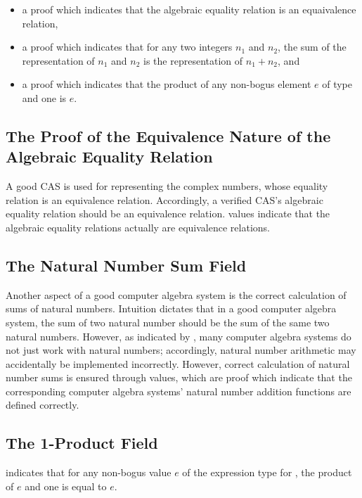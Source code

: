 \documentclass{report}
\begin{document}
\begin{itemize}
 \item a proof which indicates that the algebraic equality relation is an equaivalence relation,
 \item a proof which indicates that for any two integers \(n_1\) and \(n_2\), the sum of the representation of \(n_1\) and \(n_2\) is the representation of \(n_1 + n_2\), and
 \item a proof which indicates that the product of any non-bogus element \(e\) of type  and one is \(e\).
\end{itemize}

\subsection{The Proof of the Equivalence Nature of the Algebraic Equality Relation}
A good CAS is used for representing the complex numbers, whose equality relation is an equivalence relation.  Accordingly, a verified CAS's algebraic equality relation should be an equivalence relation.   values indicate that the algebraic equality relations actually are equivalence relations.

\subsection{The Natural Number Sum Field}
Another aspect of a good computer algebra system is the correct calculation of sums of natural numbers.  Intuition dictates that in a good computer algebra system, the sum of two natural number should be the sum of the same two natural numbers.  However, as indicated by , many computer algebra systems do not just work with natural numbers; accordingly, natural number arithmetic may accidentally be implemented incorrectly.  However, correct calculation of natural number sums is ensured through  values, which are proof which indicate that the corresponding computer algebra systems' natural number addition functions are defined correctly.

\subsection{The 1-Product Field}
  indicates that for any non-bogus value \(e\) of the expression type for , the product of \(e\) and one is equal to \(e\).
\end{document}
